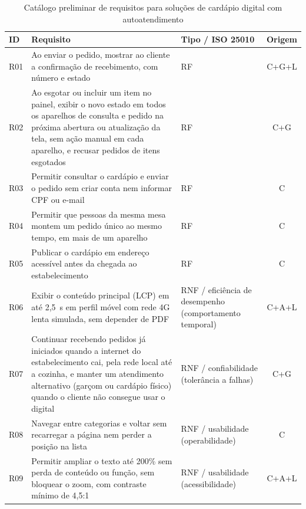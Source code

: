 \begin{table}[!ht]
    \caption{Catálogo preliminar de requisitos para soluções de cardápio digital com autoatendimento}
    \label{tab:requisitos}
    \centering%
    \begin{minipage}{.98\textwidth}
        \small
        \renewcommand{\arraystretch}{1.25}
        \begin{tabular*}{\textwidth}{l@{\extracolsep{\fill}}>{\raggedright\arraybackslash}p{7.2cm}>{\raggedright\arraybackslash}p{2.6cm}c}
            \toprule
            \textbf{ID} & \textbf{Requisito} & \textbf{Tipo / ISO 25010} & \textbf{Origem} \\
            \midrule
            R01 & Ao enviar o pedido, mostrar ao cliente a confirmação de recebimento, com número e estado & RF & C+G+L \\
            R02 & Ao esgotar ou incluir um item no painel, exibir o novo estado em todos os aparelhos de consulta e pedido na próxima abertura ou atualização da tela, sem ação manual em cada aparelho, e recusar pedidos de itens esgotados & RF & C+G \\
            R03 & Permitir consultar o cardápio e enviar o pedido sem criar conta nem informar CPF ou e-mail & RF & C \\
            R04 & Permitir que pessoas da mesma mesa montem um pedido único ao mesmo tempo, em mais de um aparelho & RF & C \\
            R05 & Publicar o cardápio em endereço acessível antes da chegada ao estabelecimento & RF & C \\
            R06 & Exibir o conteúdo principal (LCP) em até 2,5~s em perfil móvel com rede 4G lenta simulada, sem depender de PDF & RNF / eficiência de desempenho (comportamento temporal) & C+A+L \\
            R07 & Continuar recebendo pedidos já iniciados quando a internet do estabelecimento cai, pela rede local até a cozinha, e manter um atendimento alternativo (garçom ou cardápio físico) quando o cliente não consegue usar o digital & RNF / confiabilidade (tolerância a falhas) & C+G \\
            R08 & Navegar entre categorias e voltar sem recarregar a página nem perder a posição na lista & RNF / usabilidade (operabilidade) & C \\
            R09 & Permitir ampliar o texto até 200\% sem perda de conteúdo ou função, sem bloquear o zoom, com contraste mínimo de 4,5:1 & RNF / usabilidade (acessibilidade) & C+A+L \\

\end{tabular*}
\end{minipage}
\end{table}
